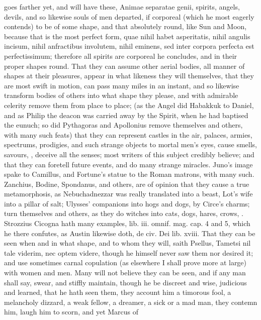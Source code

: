 {goes farther yet, and will have these, Animae separatae genii,
spirits, angels, devils, and so likewise souls of men departed, if
corporeal (which he most eagerly contends) to be of some shape, and
that absolutely round, like Sun and Moon, because that is the most
perfect form, quae nihil habet asperitatis, nihil angulis incisum,
nihil anfractibus involutem, nihil eminens, sed inter corpora perfecta
est perfectissimum; therefore all spirits are corporeal he
concludes, and in their proper shapes round. That they can assume other
aerial bodies, all manner of shapes at their pleasures, appear in what
likeness they will themselves, that they are most swift in motion, can
pass many miles in an instant, and so likewise transform bodies
of others into what shape they please, and with admirable celerity
remove them from place to place; (as the Angel did Habakkuk to Daniel,
and as Philip the deacon was carried away by the Spirit, when he had
baptised the eunuch; so did Pythagoras and Apollonius remove themselves
and others, with many such feats) that they can represent castles in
the air, palaces, armies, spectrums, prodigies, and such strange
objects to mortal men's eyes, cause smells, savours, \etc{}, deceive
all the senses; most writers of this subject credibly believe; and that
they can foretell future events, and do many strange miracles. Juno's
image spake to Camillus, and Fortune's statue to the Roman matrons,
with many such. Zanchius, Bodine, Spondanus, and others, are of opinion
that they cause a true metamorphosis, as Nebuchadnezzar was really
translated into a beast, Lot's wife into a pillar of salt; Ulysses'
companions into hogs and dogs, by Circe's charms; turn themselves and
others, as they do witches into cats, dogs, hares, crows, \etc{}. Strozzius
Cicogna hath many examples, lib. iii. omnif. mag. cap. 4 and 5, which
he there confutes, as Austin likewise doth, de civ. Dei lib. xviii.
That they can be seen when and in what shape, and to whom they will,
saith Psellus, Tametsi nil tale viderim, nec optem videre, though he
himself never saw them nor desired it; and use sometimes carnal
copulation (as elsewhere I shall prove more at large) with women
and men. Many will not believe they can be seen, and if any man shall
say, swear, and stiffly maintain, though he be discreet and wise,
judicious and learned, that he hath seen them, they account him a
timorous fool, a melancholy dizzard, a weak fellow, a dreamer, a sick
or a mad man, they contemn him, laugh him to scorn, and yet Marcus of
}
